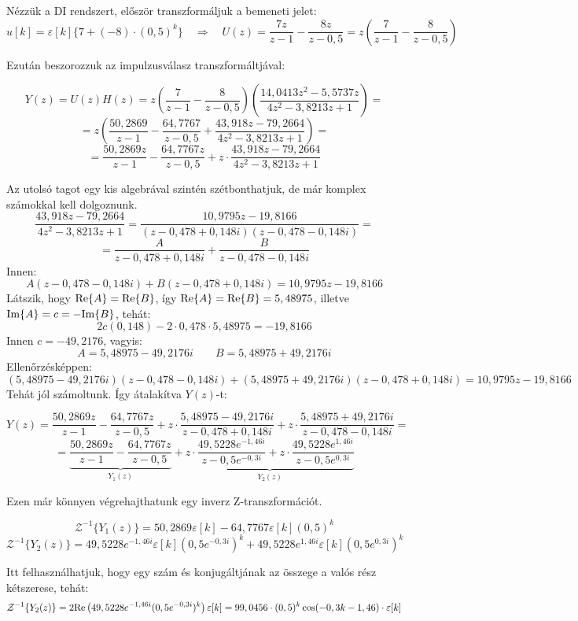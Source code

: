\documentclass[12pt,a4paper]{article}
\begin{document}
Nézzük a DI rendszert, először transzformáljuk a bemeneti jelet:
\[u[k] = \varepsilon[k]\{7 + (-8)\cdot(0,5)^k\} \quad \Rightarrow \quad U(z) = \frac{7z}{z-1} - \frac{8z}{z-0,5} = z\left(\frac{7}{z-1}-\frac{8}{z-0,5}\right)\]

Ezután beszorozzuk az impulzusválasz transzformáltjával:

\[Y(z) = U(z)H(z) = z\left(\frac{7}{z-1}-\frac{8}{z-0,5}\right)\left(\frac{14,0413z^2 - 5,5737 z}{4z^2-3,8213 z + 1}\right) =\]
\[= z\left(\frac{50,2869}{z-1}-\frac{64,7767}{z-0,5}+\frac{43,918z - 79,2664}{4z^2-3,8213 z + 1}\right) = \]
\[= \frac{50,2869z}{z-1}-\frac{64,7767z}{z-0,5}+z\cdot\frac{43,918z - 79,2664}{4z^2-3,8213 z + 1}\]

Az utolsó tagot egy kis algebrával szintén szétbonthatjuk, de már komplex számokkal kell dolgoznunk.
\[\frac{43,918z - 79,2664}{4z^2-3,8213 z + 1} = \frac{10,9795z - 19,8166}{(z-0,478+0,148i)(z-0,478-0,148i)} = \]
\[= \frac{A}{z-0,478+0,148i} + \frac{B}{z-0,478-0,148i}\]
Innen:
\[A(z-0,478-0,148i) + B(z-0,478+0,148i) = 10,9795z - 19,8166\]
Látszik, hogy $\hbox{Re}\{A\}=\hbox{Re}\{B\}$, így $\hbox{Re}\{A\}=\hbox{Re}\{B\}=5,48975$, illetve $\hbox{Im}\{A\}=c=-\hbox{Im}\{B\}$, tehát:
\[2c(0,148) - 2\cdot 0,478\cdot 5,48975 = - 19,8166\]
Innen $c = -49,2176$, vagyis:
\[A = 5,48975 -49,2176i \qquad B = 5,48975 + 49,2176i\]
Ellenőrzésképpen:
\[(5,48975 - 49,2176i)(z-0,478-0,148i) + (5,48975 + 49,2176i)(z-0,478+0,148i) = 10,9795z - 19,8166\]
Tehát jól számoltunk. Így átalakítva $Y(z)$-t:

\[Y(z) = \frac{50,2869z}{z-1}-\frac{64,7767z}{z-0,5}+z\cdot\frac{5,48975 - 49,2176i}{z-0,478+0,148i} + z\cdot\frac{5,48975 + 49,2176i}{z-0,478-0,148i} = \]
\[= \underbrace{\frac{50,2869z}{z-1}-\frac{64,7767z}{z-0,5}}_{Y_1(z)}+\underbrace{z\cdot\frac{49,5228e^{-1,46i}}{z-0,5e^{-0,3i}} + z\cdot\frac{49,5228e^{1,46i}}{z-0,5e^{0,3i}}}_{Y_2(z)}\]

Ezen már könnyen végrehajthatunk egy inverz Z-transzformációt.

\[\mathcal{Z}^{-1}\{Y_1(z)\} = 50,2869\varepsilon[k] - 64,7767\varepsilon[k](0,5)^k\]
\[\mathcal{Z}^{-1}\{Y_2(z)\} = 49,5228e^{-1,46i}\varepsilon[k](0,5e^{-0,3i})^k + 49,5228e^{1,46i}\varepsilon[k](0,5e^{0,3i})^k\]

Itt felhasználhatjuk, hogy egy szám és konjugáltjának az összege a valós rész kétszerese, tehát:
\[\mathcal{Z}^{-1}\{Y_2(z)\} = 2\hbox{Re}\left( 49,5228e^{-1,46i}(0,5e^{-0,3i})^k \right)\varepsilon[k] = 99,0456 \cdot (0,5)^k \cos(-0,3k-1,46)\cdot \varepsilon[k]\]
\end{document}
